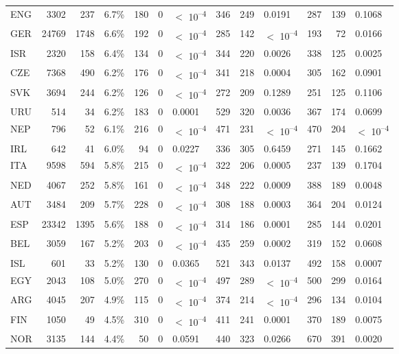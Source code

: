 \begin{tabular}[t]{lrrlrrlrrlrrl}
ENG & 3302 & 237 & 6.7\% & 180 & 0 & $<$ 10\textsuperscript{--4} & 346 & 249 & 0.0191 & 287 & 139 & 0.1068\\
GER & 24769 & 1748 & 6.6\% & 192 & 0 & $<$ 10\textsuperscript{--4} & 285 & 142 & $<$ 10\textsuperscript{--4} & 193 & 72 & 0.0166\\
ISR & 2320 & 158 & 6.4\% & 134 & 0 & $<$ 10\textsuperscript{--4} & 344 & 220 & 0.0026 & 338 & 125 & 0.0025\\
CZE & 7368 & 490 & 6.2\% & 176 & 0 & $<$ 10\textsuperscript{--4} & 341 & 218 & 0.0004 & 305 & 162 & 0.0901\\
SVK & 3694 & 244 & 6.2\% & 126 & 0 & $<$ 10\textsuperscript{--4} & 272 & 209 & 0.1289 & 251 & 125 & 0.1106\\
URU & 514 & 34 & 6.2\% & 183 & 0 & 0.0001 & 529 & 320 & 0.0036 & 367 & 174 & 0.0699\\
NEP & 796 & 52 & 6.1\% & 216 & 0 & $<$ 10\textsuperscript{--4} & 471 & 231 & $<$ 10\textsuperscript{--4} & 470 & 204 & $<$ 10\textsuperscript{--4}\\
IRL & 642 & 41 & 6.0\% & 94 & 0 & 0.0227 & 336 & 305 & 0.6459 & 271 & 145 & 0.1662\\
ITA & 9598 & 594 & 5.8\% & 215 & 0 & $<$ 10\textsuperscript{--4} & 322 & 206 & 0.0005 & 237 & 139 & 0.1704\\
NED & 4067 & 252 & 5.8\% & 161 & 0 & $<$ 10\textsuperscript{--4} & 348 & 222 & 0.0009 & 388 & 189 & 0.0048\\
AUT & 3484 & 209 & 5.7\% & 228 & 0 & $<$ 10\textsuperscript{--4} & 308 & 188 & 0.0003 & 364 & 204 & 0.0124\\
ESP & 23342 & 1395 & 5.6\% & 188 & 0 & $<$ 10\textsuperscript{--4} & 314 & 186 & 0.0001 & 285 & 144 & 0.0201\\
BEL & 3059 & 167 & 5.2\% & 203 & 0 & $<$ 10\textsuperscript{--4} & 435 & 259 & 0.0002 & 319 & 152 & 0.0608\\
ISL & 601 & 33 & 5.2\% & 130 & 0 & 0.0365 & 521 & 343 & 0.0137 & 492 & 158 & 0.0007\\
EGY & 2043 & 108 & 5.0\% & 270 & 0 & $<$ 10\textsuperscript{--4} & 497 & 289 & $<$ 10\textsuperscript{--4} & 500 & 299 & 0.0164\\
ARG & 4045 & 207 & 4.9\% & 115 & 0 & $<$ 10\textsuperscript{--4} & 374 & 214 & $<$ 10\textsuperscript{--4} & 296 & 134 & 0.0104\\
FIN & 1050 & 49 & 4.5\% & 310 & 0 & $<$ 10\textsuperscript{--4} & 411 & 241 & 0.0001 & 370 & 189 & 0.0075\\
NOR & 3135 & 144 & 4.4\% & 50 & 0 & 0.0591 & 440 & 323 & 0.0266 & 670 & 391 & 0.0020\\

\end{tabular}
